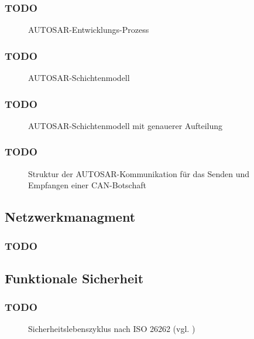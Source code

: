 \documentclass[draft]{beamer}
\newcommand{\inputImage}[1]{}
\begin{document}
\begin{frame}
\frametitle{TODO}
    \begin{figure}[ht]
        \centering
        \resizebox{\linewidth}{!}{\inputImage{Autosar_Prozess.dia}}
        \caption{AUTOSAR-Entwicklungs-Prozess}
        \label{fig:autosar_prozess}
    \end{figure}
\end{frame}

\begin{frame}
\frametitle{TODO}
    \begin{figure}[ht]
        \centering
        \resizebox{\linewidth}{!}{\inputImage{autosar_layer.dia}}
        \caption{AUTOSAR-Schichtenmodell}
        \label{fig:autosar_layer}
    \end{figure}
\end{frame}

\begin{frame}
\frametitle{TODO}
    \begin{figure}[ht]
        \centering
        \resizebox{\linewidth}{!}{\inputImage{autosar_refined_layer.dia}}
        \caption{AUTOSAR-Schichtenmodell mit genauerer Aufteilung}
        \label{fig:autosar_refined_layer}
    \end{figure}
\end{frame}

\begin{frame}
\frametitle{TODO}
    \begin{figure}[ht]
        \centering
        \inputImage{komm_beispiel.dia}
        \caption[Struktur der AUTOSAR-Kommunikation]{Struktur der AUTOSAR-Kommunikation für das Senden und Empfangen einer CAN-Botschaft}
        \label{fig:komm_beispiel}
    \end{figure}
\end{frame}




\subsection{Netzwerkmanagment}
\begin{frame}
\frametitle{TODO}

\end{frame}




\subsection{Funktionale Sicherheit}
\begin{frame}
\frametitle{TODO}
    \begin{figure}[!htbp]
        \center
        \inputImage{ISO_26262_Lifecycle.dia}
        \caption[Sicherheitslebenszyklus nach ISO 26262]{Sicherheitslebenszyklus nach ISO 26262 (vgl. \cite{iso26262})}
        \label{fig:lifecycle}
    \end{figure}
\end{frame}
\end{document}
